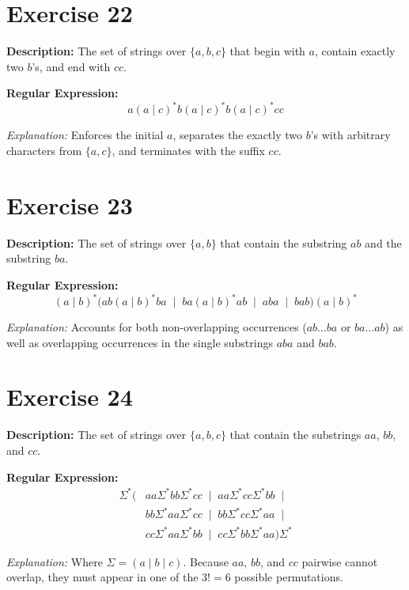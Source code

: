 \documentclass[12pt]{article}
\newcommand{\exercisedescription}[1]{%
    \Needspace{4\baselineskip}%
    \noindent\textbf{Description:} #1\par
    \vspace{0.25cm}
}
\newcommand{\reexpression}[1]{%
    \noindent\textbf{Regular Expression:}
    \vspace{-0.25cm}
    \begin{equation*}
        #1
    \end{equation*}
    \vspace{-0.15cm}
}
\newcommand{\reexplanation}[1]{%
    \noindent\textit{Explanation:} #1\par
    \vspace{0.55cm}
}
\begin{document}

\section*{Exercise 22}
\exercisedescription{%
    The set of strings over $\{a,b,c\}$ that begin with $a$, contain exactly two $b$'s, and end with $cc$.
}
\reexpression{%
    a (a \mid c)^* b (a \mid c)^* b (a \mid c)^* cc
}
\reexplanation{%
    Enforces the initial $a$, separates the exactly two $b$'s with arbitrary characters from $\{a, c\}$, and terminates with the suffix $cc$.
}


\section*{Exercise 23}
\exercisedescription{%
    The set of strings over $\{a,b\}$ that contain the substring $ab$ and the substring $ba$.
}
\reexpression{%
    (a \mid b)^* \big(ab (a \mid b)^* ba \;\mid\; ba (a \mid b)^* ab \;\mid\; aba \;\mid\; bab\big) (a \mid b)^*
}
\reexplanation{%
    Accounts for both non-overlapping occurrences ($ab \dots ba$ or $ba \dots ab$) as well as overlapping occurrences in the single substrings $aba$ and $bab$.
}
\newpage


\section*{Exercise 24}
\exercisedescription{%
    The set of strings over $\{a,b,c\}$ that contain the substrings $aa$, $bb$, and $cc$.
}
\reexpression{%
    \begin{aligned}
        \Sigma^* \big( & aa \Sigma^* bb \Sigma^* cc \;\mid\; aa \Sigma^* cc \Sigma^* bb \;\mid\; \\
                       & bb \Sigma^* aa \Sigma^* cc \;\mid\; bb \Sigma^* cc \Sigma^* aa \;\mid\; \\
                       & cc \Sigma^* aa \Sigma^* bb \;\mid\; cc \Sigma^* bb \Sigma^* aa \big) \Sigma^*
    \end{aligned}
}
\reexplanation{%
    Where $\Sigma = (a \mid b \mid c)$. Because $aa$, $bb$, and $cc$ pairwise cannot overlap, they must appear in one of the $3! = 6$ possible permutations.
}
\end{document}
